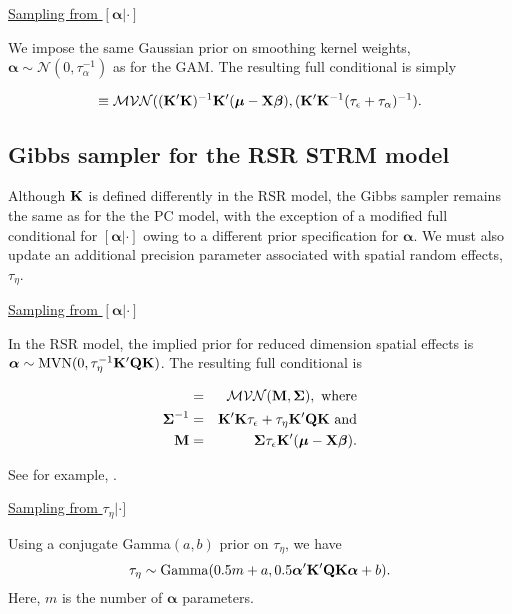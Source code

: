 \documentclass[12pt,fleqn]{article}
\begin{document}
\begin{flushleft}
\underline{Sampling from $[\boldsymbol{\alpha}|\cdot]$}

We impose the same Gaussian prior on smoothing kernel weights, $\boldsymbol{\alpha} \sim \mathcal{N}(0,\tau_\alpha^{-1})$ as for the GAM.  The resulting full conditional is simply
\begin{linenomath*}
\begin{equation*}
   [\boldsymbol{\alpha} | \cdot] \equiv \mathcal{MVN}(({\bf K}^\prime {\bf K})^{-1}{\bf K}^\prime (\boldsymbol{\mu}-{\bf X}\boldsymbol{\beta}),({\bf K}^\prime {\bf K}^{-1} (\tau_\epsilon + \tau_\alpha)^{-1}).
\end{equation*}
\end{linenomath*}

\subsection{Gibbs sampler for the RSR STRM model}

Although ${\bf K}$ is defined differently in the RSR model, the Gibbs sampler remains the same as for the the PC model, with the exception of a modified full conditional for $[\boldsymbol{\alpha}|\cdot]$ owing to a different prior specification for $\boldsymbol{\alpha}$.  We must also update an additional precision parameter associated with spatial random effects, $\tau_\eta$.

\underline{Sampling from $[\boldsymbol{\alpha}|\cdot]$}

In the RSR model, the implied prior for reduced dimension spatial effects is $\boldsymbol{\alpha} \sim \text{MVN}(0,\tau_\eta^{-1}{\bf K}^\prime {\bf Q} {\bf K})$.  The resulting full conditional is
\begin{linenomath*}
\begin{eqnarray*}
   [\boldsymbol{\alpha} | \cdot] & = & \mathcal{MVN}({\bf M},\boldsymbol{\Sigma}), \text{ where} \\
   \boldsymbol{\Sigma}^{-1} & = & {\bf K}^\prime {\bf K}\tau_\epsilon+\tau_\eta{\bf K}^\prime {\bf Q} {\bf K} \text{ and} \\
    {\bf M} & = & \boldsymbol{\Sigma} \tau_\epsilon {\bf K}^\prime (\boldsymbol{\mu} - {\bf X} \boldsymbol{\beta}).
\end{eqnarray*}
\end{linenomath*}
See for example, \citet{ConnEtAl2014}.

\underline{Sampling from $\tau_\eta|\cdot]$}

Using a conjugate Gamma$(a,b)$ prior on $\tau_\eta$, we have
  \begin{equation*}
  \tau_{\eta} \sim {\rm Gamma}(0.5m + a,0.5 \boldsymbol{\alpha}^\prime
  {\bf K}^\prime {\bf Q} {\bf K}\boldsymbol{\alpha}+b).
  \end{equation*}
  Here, $m$ is the number of $\boldsymbol{\alpha}$ parameters.\\



\end{flushleft}
\end{document}
